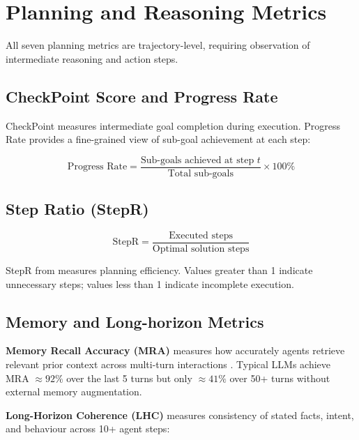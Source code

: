 \documentclass[11pt,a4paper]{article}
\newcommand{\metricname}[1]{\textbf{#1}}
\begin{document}
\section{Planning and Reasoning Metrics}
\label{sec:planning}

All seven planning metrics are trajectory-level, requiring observation of intermediate
reasoning and action steps.

\subsection{CheckPoint Score and Progress Rate}

CheckPoint \citep{mobile_bench2024} measures intermediate goal completion during
execution. Progress Rate \citep{agentboard2024} provides a fine-grained view of
sub-goal achievement at each step:

\begin{equation}
  \text{Progress Rate} = \frac{\text{Sub-goals achieved at step } t}
                               {\text{Total sub-goals}} \times 100\%
\end{equation}

\subsection{Step Ratio (StepR)}

\begin{equation}
  \text{StepR} = \frac{\text{Executed steps}}{\text{Optimal solution steps}}
\end{equation}

StepR from \citet{comm_verify2025} measures planning efficiency. Values greater than 1
indicate unnecessary steps; values less than 1 indicate incomplete execution.

\subsection{Memory and Long-horizon Metrics}

\metricname{Memory Recall Accuracy (MRA)} measures how accurately agents retrieve
relevant prior context across multi-turn interactions \citep{llm_eval_survey2025}.
Typical LLMs achieve MRA $\approx 92\%$ over the last 5 turns but only $\approx 41\%$
over 50+ turns without external memory augmentation.

\metricname{Long-Horizon Coherence (LHC)} measures consistency of stated facts,
intent, and behaviour across 10+ agent steps:
\end{document}
